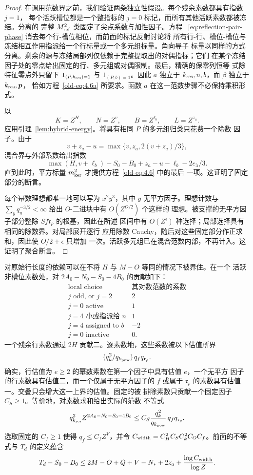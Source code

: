 \documentclass[11pt,a4paper]{article}
\numberwithin{equation}{section}
\numberwithin{figure}{section}
\theoremstyle{definition}
\theoremstyle{remark}
\begin{document}
\begin{proof}
在调用范数界之前，我们验证两条独立性假设。每个残余素数都具有指数 \(j=1\)，
每个活跃槽位都是一个整指标的 \(j=0\) 标记，而所有其他活跃素数都被冻结。分离的
完整 \(M_{\rm ref}^2\) 类固定了尖点系数与加性因子。方程
~\eqref{eq:reflection-pair-phase} 消去每个行-槽位相位，而前面的标记反射讨论将
所有行-行、槽位-槽位与冻结相互作用指派给一个行标量或一个多元组标量。角向导子
标量以同样的方式分离。剩余的源与冻结局部列仅依赖于完整提取出的对偶指标；它们
在某个冻结因子处的零点给出固定的行、多元组或对偶限制。最后，精确的保零列恒等
式除特征零点外只留下 \(1_{(P,k_{\rm res})=1}\) 与 \(1_{(P,b)=1}\)。因此 \(a\)
独立于 \(k_{\rm res},n,b\)，而 \(\beta\) 独立于 \(k_{\rm res},\boldsymbol p\)，
恰如方程~\eqref{old-eq:4.6a} 所要求。函数 \(a\) 在这一范数步骤不必保持乘积形式。

以
\[
 K=Z^H,\qquad N=Z^v,\qquad B=Z^{\ell_b},\qquad L=Z^{z_a}.
\]
应用引理~\ref{lem:hybrid-energy}。将具有相同 \(P\) 的多元组归类只花费一个除数
因子。由于
\[
 v+z_a-u=\max\{v,z_a,2(v+z_a)/3\},
\]
混合界与外部系数给出指数
\[
 \max(H,v+\ell_b)-S_0-B_0+z_a-u-\ell_b-2e_\lambda/3.
\]
直到此时，平方标量 \(m_{\rm ker}^2\) 才提供方程~\eqref{old-eq:4.6} 中的最后
一项。这证明了固定部分的断言。

每个幂数理想都唯一地可以写为 \(x^2y^3\)，其中 \(y\) 无平方因子。理想计数与
\(\sum_yq_y^{-3/2}<\infty\) 给出 \(O\)-二进块中有 \(O(Z^{O/2})\) 个这样的
理想。被支撑的无平方因子部分整除 \(S f\mathfrak r_\rho\) 的根基，因此在所述
区间中有 \(O(Z^\epsilon)\) 种选择；局部选择具有相同的除数界。对局部展开逐行
应用除数 Cauchy，随后对这些固定部分作正求和，因此使 \(O/2+\epsilon\) 只增加
一次。活跃多元组已在混合范数内部，不再计入。这证明了聚合断言。
\end{proof}

对原始行长度的依赖可以在不将 \(H\) 与 \(M-O\) 等同的情况下被界住。在一个
活跃非槽位素数处，对 \(2A_0-N_0-S_0-4B_0\) 的贡献如下：
\[
 \begin{array}{c|c}
 \text{local choice}&\text{其对数范数的系数}\\ \hline
 j\text{ odd, or }j=2&2\\
 j=0\text{ active}&1\\
 j=4\text{ 小或指派给 }n&1\\
 j=4\text{ assigned to }b&-2\\
 j=0\text{ inactive}&0.
 \end{array}
\]
一个残余行素数通过 \(2H\) 贡献二。逐素数地，这些系数被以下估值所界
\[
 (q_k^2/q_{k_{\rm pow}})\,q_fq_{\mathfrak r_\rho}.
\]
确实，行估值为 \(e\ge2\) 的幂数素数在第一个因子中具有估值 \(e\)，一个无平方
因子的行素数具有估值二，而一个仅属于无平方因子的 \(f\) 或属于
\(\mathfrak r_\rho\) 的素数具有估值一。交叠只会增大这一上界的估值。固定的被
排除素数只贡献一个固定因子 \(C_S\ge1\)。等价地，对素数求和给出实际的范数
不等式
\[
 q_{k_{\rm res}}^2 Z^{2A_0-N_0-S_0-4B_0}
 \le C_S\frac{q_k^2}{q_{k_{\rm pow}}}\,q_fq_{\mathfrak r_\rho}.
\]
选取固定的 \(C_f\ge1\) 使得 \(q_f\le C_fZ^V\)，并令
\(C_{\rm width}=C_H^2C_SC_k^2C_OC_f\)。前面的不等式与 \(T_d\) 的定义蕴含
\begin{equation}\label{eq:common-width-charge}
 T_d-S_0-B_0
 \le 2M-O+Q+V-N_*+2z_a+
       \frac{\log C_{\rm width}}{\log Z}.
\end{equation}
\end{document}
